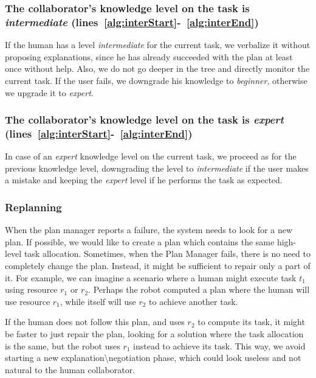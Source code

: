 \subsubsection{The collaborator's knowledge level on the task is \textit{intermediate} (lines~\ref{alg:interStart}-~\ref{alg:interEnd})}
 If the human has a level \textit{intermediate} for the current task, we verbalize it without proposing explanations, since he has already  succeeded with the plan at least once without help. Also, we do not go deeper in the tree and directly monitor the current task. If the user  fails, we downgrade his knowledge to \textit{beginner}, otherwise we upgrade it to \textit{expert}.

\subsubsection{The collaborator's knowledge level on the task is \textit{expert} (lines~\ref{alg:interStart}-~\ref{alg:interEnd})}
 In case of an \textit{expert} knowledge level on the current task, we  proceed as for the previous knowledge level, downgrading the level to \textit{intermediate} if the user makes a mistake and keeping the \textit{expert} level if he performs the task as expected.



\subsubsection{Replanning}
When the plan manager reports a failure, the system needs to look for a new plan. If possible, we would like to create a plan which contains the same high-level task allocation. Sometimes, when the Plan Manager fails, there is no need to completely change the plan. Instead, it might be sufficient to repair only a part of it. For example, we can imagine a scenario where a human might execute task $t_1$ using resource $r_1$ or $r_2$. Perhaps the robot computed a plan where the human will use resource $r_1$, while itself will use $r_2$ to achieve another task.

If the human does not follow this plan, and uses $r_2$ to compute its task,  it might be faster to just repair the plan, looking for a solution where the task allocation is the same, but the robot uses $r_1$ instead to achieve its task. This way, we avoid starting a new explanation\textbackslash negotiation phase, which could look useless and not natural to the human collaborator.

